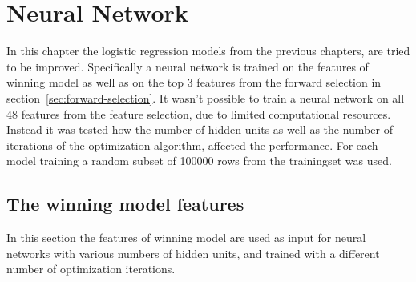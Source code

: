 \chapter{Neural Network}
In this chapter the logistic regression models from the previous chapters, are tried to be improved. Specifically a neural network is trained on the features of winning model as well as on the top 3 features from the forward selection in section~\ref{sec:forward-selection}. It wasn't possible to train a neural network on all 48 features from the feature selection, due to limited computational resources. Instead it was tested how the number of hidden units as well as the number of iterations of the optimization algorithm, affected the performance. For each model training a random subset of 100000 rows from the trainingset was used.

\section{The winning model features}
In this section the features of winning model are used as input for neural networks with various numbers of hidden units, and trained with a different number of optimization iterations.



